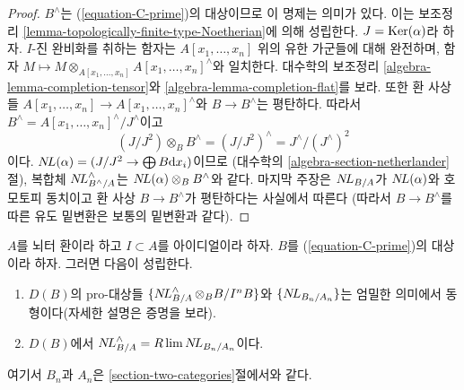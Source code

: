 \begin{proof}
$B^\wedge$는 (\ref{equation-C-prime})의 대상이므로 이 명제는 의미가 있다.
이는 보조정리 \ref{lemma-topologically-finite-type-Noetherian}에 의해 성립한다.
$J = \mathop{\mathrm{Ker}}(\alpha)$라 하자. $I$-진 완비화를 취하는 함자는
$A[x_1, \ldots, x_n]$ 위의 유한 가군들에 대해 완전하며, 함자
$M \mapsto M \otimes_{A[x_1, \ldots, x_n]} A[x_1, \ldots, x_n]^\wedge$와 일치한다.
대수학의 보조정리 \ref{algebra-lemma-completion-tensor}와
\ref{algebra-lemma-completion-flat}를 보라. 또한 환 사상들
$A[x_1, \ldots, x_n] \to A[x_1, \ldots, x_n]^\wedge$와
$B \to B^\wedge$는 평탄하다. 따라서
$B^\wedge = A[x_1, \ldots, x_n]^\wedge / J^\wedge$이고
$$
(J/J^2) \otimes_B B^\wedge = (J/J^2)^\wedge = J^\wedge/(J^\wedge)^2
$$
이다. $\mathop{N\!L}\nolimits(\alpha) = (J/J^2 \to \bigoplus B\text{d}x_i)$이므로
(대수학의 \ref{algebra-section-netherlander}절), 복합체
$\mathop{N\!L}\nolimits_{B^\wedge/A}^\wedge$는 $\mathop{N\!L}\nolimits(\alpha) \otimes_B B^\wedge$와 같다.
마지막 주장은 $\mathop{N\!L}\nolimits_{B/A}$가 $\mathop{N\!L}\nolimits(\alpha)$와 호모토피 동치이고
환 사상 $B \to B^\wedge$가 평탄하다는 사실에서 따른다
(따라서 $B \to B^\wedge$를 따른 유도 밑변환은 보통의 밑변환과 같다).
\end{proof}

\begin{lemma}
\label{lemma-NL-is-limit}
$A$를 뇌터 환이라 하고 $I \subset A$를 아이디얼이라 하자.
$B$를 (\ref{equation-C-prime})의 대상이라 하자. 그러면 다음이 성립한다.
\begin{enumerate}
\item $D(B)$의 pro-대상들
$\{\mathop{N\!L}\nolimits_{B/A}^\wedge \otimes_B B/I^nB\}$와 $\{\mathop{N\!L}\nolimits_{B_n/A_n}\}$는
엄밀한 의미에서 동형이다(자세한 설명은 증명을 보라).
\item $D(B)$에서 $\mathop{N\!L}\nolimits_{B/A}^\wedge = R\mathop{\mathrm{lim}}\nolimits \mathop{N\!L}\nolimits_{B_n/A_n}$이다.
\end{enumerate}
여기서 $B_n$과 $A_n$은 \ref{section-two-categories}절에서와 같다.
\end{lemma}

